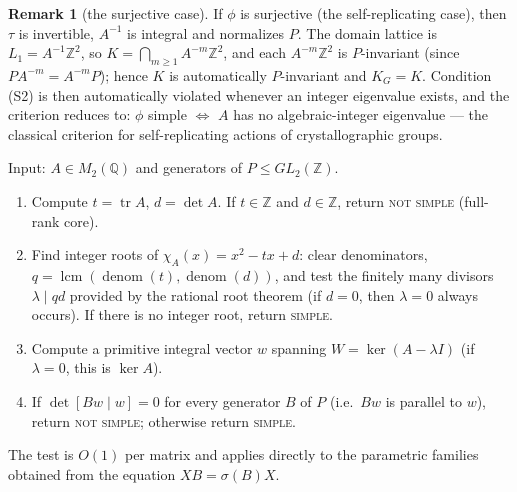 \documentclass[12pt]{article}
\theoremstyle{definition}
\newtheorem{remark}{Remark}
\begin{document}
\begin{remark}[the surjective case]
If $\phi$ is surjective (the self-replicating case), then $\tau$ is
invertible, $A^{-1}$ is integral and normalizes $P$. The domain lattice
is $L_1=A^{-1}\mathbb{Z}^2$, so
$K=\bigcap_{m\ge1}A^{-m}\mathbb{Z}^2$, and each $A^{-m}\mathbb{Z}^2$ is
$P$-invariant (since $PA^{-m}=A^{-m}P$); hence $K$ is automatically
$P$-invariant and $K_G=K$. Condition (S2) is then automatically
violated whenever an integer eigenvalue exists, and the criterion
reduces to: $\phi$ simple $\iff$ $A$ has no algebraic-integer
eigenvalue --- the classical criterion for self-replicating actions of
crystallographic groups.
\end{remark}

Input: $A\in M_2(\mathbb{Q})$ and generators of $P\le GL_2(\mathbb{Z})$.
\begin{enumerate}
\item Compute $t=\operatorname{tr}A$, $d=\det A$. If
$t\in\mathbb{Z}$ and $d\in\mathbb{Z}$, return \textsc{not simple}
(full-rank core).
\item Find integer roots of $\chi_A(x)=x^2-tx+d$: clear denominators,
$q=\operatorname{lcm}(\operatorname{denom}(t),\operatorname{denom}(d))$,
and test the finitely many divisors $\lambda\mid qd$ provided by the
rational root theorem (if $d=0$, then $\lambda=0$ always occurs). If
there is no integer root, return \textsc{simple}.
\item Compute a primitive integral vector $w$ spanning
$W=\ker(A-\lambda I)$ (if $\lambda=0$, this is $\ker A$).
\item If $\det[Bw\mid w]=0$ for every generator $B$ of $P$ (i.e.\ $Bw$
is parallel to $w$), return \textsc{not simple}; otherwise return
\textsc{simple}.
\end{enumerate}
The test is $O(1)$ per matrix and applies directly to the parametric
families obtained from the equation $XB=\sigma(B)X$.
\end{document}
